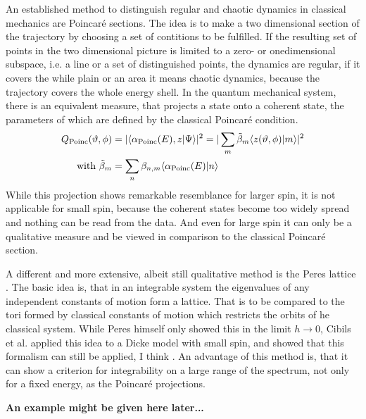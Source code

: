 An established method to distinguish regular and chaotic dynamics in classical mechanics are Poincar\'e sections.
The idea is to make a two dimensional section of the trajectory by choosing a set of contitions to be fulfilled. 
If the resulting set of points in the two dimensional picture is limited to a zero- or onedimensional subspace, i.e. a line or a set of distinguished points, the dynamics are regular, if it covers the while plain or an area it means chaotic dynamics, because the trajectory covers the whole energy shell.
In the quantum mechanical system, there is an equivalent measure, that projects a state onto a coherent state, the parameters of which are defined by the classical Poincar\'e condition.
\begin{align}
  Q_\text{Poinc} (\vartheta,\phi)&= |{\langle\alpha_\text{Poinc}(E),z|\Psi\rangle}|^2 = |\sum\limits_m \tilde\beta_{m} {\langle z(\vartheta,\phi)|m\rangle}|^2\\
  \text{with  } \tilde\beta_m &= \sum\limits_n \beta_{n,m}{\langle\alpha_\text{Poinc}(E)|n\rangle}
\end{align}
While this projection shows remarkable resemblance for larger spin, it is not applicable for small spin, because the coherent states become too widely spread and nothing can be read from the data.
And even for large spin it can only be a qualitative measure and be viewed in comparison to the classical Poincar\'e section.


A different and more extensive, albeit still qualitative method is the Peres lattice \cite{AP84}.
The basic idea is, that in an integrable system the eigenvalues of any independent constants of motion form a lattice. 
That is to be compared to the tori formed by classical constants of motion which restricts the orbits of he classical system.
While Peres himself only showed this in the limit $h \rightarrow 0$, Cibils et al. applied this idea to a Dicke model with small spin, and showed that this formalism can still be applied, I think \cite{MCYC94}.
An advantage of this method is, that it can show a criterion for integrability on a large range of the spectrum, not only for a fixed energy, as the Poincar\'e projections.

\textbf{An example might be given here later...}


